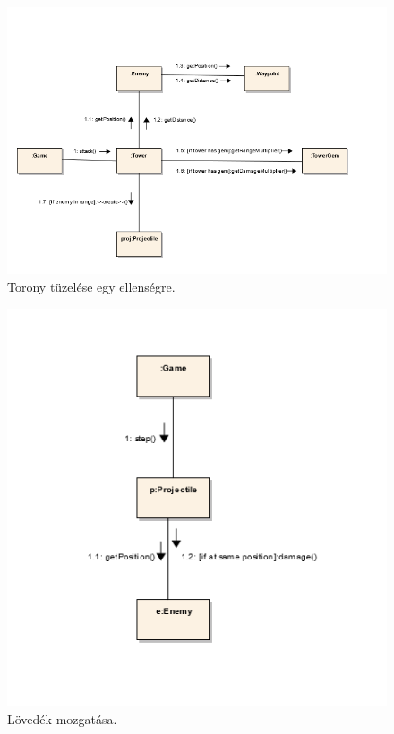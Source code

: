 \begin{figure}[H]
\begin{center}
\includegraphics{images/ch05/attackKomm.png}
\caption{Torony tüzelése egy ellenségre.}
\label{fig:attackKomm}
\end{center}
\end{figure}

\begin{figure}[H]
\begin{center}
\includegraphics{images/ch05/projectileMoveKomm.png}
\caption{Lövedék mozgatása.}
\label{fig:projectileMoveKomm}
\end{center}
\end{figure}

